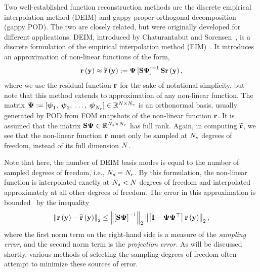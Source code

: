Two well-established function reconstruction methods are the discrete empirical interpolation method (DEIM) and gappy proper orthogonal decomposition (gappy POD). The two are closely related, but were originally developed for different applications. DEIM, introduced by Chaturantabut and Sorensen~\cite{Chaturantabut2010}, is a discrete formulation of the empirical interpolation method (EIM)~\cite{Barrault2004}. It introduces an approximation of non-linear functions of the form,
%
\begin{equation}\label{eq:deimRHSApprox}
    \resFunc{\dummyVec} \approx \resApproxFunc{\dummyVec} \defEq \deimBasis \left[ \sampMat \deimBasis \right]^{-1} \sampMat \resFunc{\dummyVec},
\end{equation}
%
where we use the residual function $\mathbf{r}$ for the sake of notational simplicity, but note that this method extends to approximation of any non-linear function. The matrix $\deimBasis \defEq [\deimBasisVec_1, \; \deimBasisVec_2, \; \hdots, \; \deimBasisVec_{\numResModes}] \inRTwo{\numDOF}{\numResModes}$ is an orthonormal basis, usually generated by POD from FOM snapshots of the non-linear function $\mathbf{r}$. It is assumed that the matrix $\sampMat \deimBasis \inRTwo{\numSamps}{\numResModes}$ has full rank. Again, in computing $\mathbf{\widetilde{r}}$, we see that the non-linear function $\mathbf{r}$ must only be sampled at $N_s$ degrees of freedom, instead of its full dimension $N$.

Note that here, the number of DEIM basis modes is equal to the number of sampled degrees of freedom, i.e., $N_s = N_r$. By this formulation, the non-linear function is interpolated exactly at $N_s < N$ degrees of freedom and interpolated approximately at all other degrees of freedom. The error in this approximation is bounded~\cite{Chaturantabut2010} by the inequality
%
\begin{equation}\label{eq:deimErrorBound}
   \left\Vert \resFunc{\dummyVec} - \resApproxFunc{\dummyVec} \right\Vert_2 \le \left\Vert \left[ \sampMat \deimBasis \right]^{-1} \right\Vert_2 \left\Vert \left[ \identMat - \deimBasis \deimBasis^\top \right] \resFunc{\dummyVec} \right\Vert_2,
\end{equation}
%
where the first norm term on the right-hand side is a measure of the \textit{sampling error}, and the second norm term is the \textit{projection error}. As will be discussed shortly, various methods of selecting the sampling degrees of freedom often attempt to minimize these sources of error.

